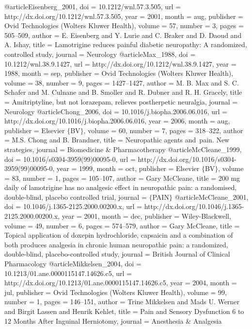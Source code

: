 @article{Eisenberg_2001,
	doi = {10.1212/wnl.57.3.505},
	url = {http://dx.doi.org/10.1212/wnl.57.3.505},
	year = 2001,
	month = {aug},
	publisher = {Ovid Technologies (Wolters Kluwer Health)},
	volume = {57},
	number = {3},
	pages = {505--509},
	author = {E. Eisenberg and Y. Lurie and C. Braker and D. Daoud and A. Ishay},
	title = {Lamotrigine reduces painful diabetic neuropathy: A randomized, controlled study},
	journal = {Neurology}
}
@article{Max_1988,
	doi = {10.1212/wnl.38.9.1427},
	url = {http://dx.doi.org/10.1212/wnl.38.9.1427},
	year = 1988,
	month = {sep},
	publisher = {Ovid Technologies (Wolters Kluwer Health)},
	volume = {38},
	number = {9},
	pages = {1427--1427},
	author = {M. B. Max and S. C. Schafer and M. Culnane and B. Smoller and R. Dubner and R. H. Gracely},
	title = {Amitriptyline, but not lorazepam, relieves postherpetic neuralgia},
	journal = {Neurology}
}
@article{Chong_2006,
	doi = {10.1016/j.biopha.2006.06.016},
	url = {http://dx.doi.org/10.1016/j.biopha.2006.06.016},
	year = 2006,
	month = {aug},
	publisher = {Elsevier $\lbrace$BV$\rbrace$},
	volume = {60},
	number = {7},
	pages = {318--322},
	author = {M.S. Chong and B. Brandner},
	title = {Neuropathic agents and~pain. New strategies},
	journal = {Biomedicine {\&} Pharmacotherapy}
}
@article{McCleane_1999,
	doi = {10.1016/s0304-3959(99)00095-0},
	url = {http://dx.doi.org/10.1016/s0304-3959(99)00095-0},
	year = 1999,
	month = {oct},
	publisher = {Elsevier $\lbrace$BV$\rbrace$},
	volume = {83},
	number = {1},
	pages = {105--107},
	author = {Gary McCleane},
	title = {200 mg daily of lamotrigine has no analgesic effect in neuropathic pain: a randomised, double-blind, placebo controlled trial},
	journal = {$\lbrace$PAIN$\rbrace$}
}
@article{McCleane_2001,
	doi = {10.1046/j.1365-2125.2000.00200.x},
	url = {http://dx.doi.org/10.1046/j.1365-2125.2000.00200.x},
	year = 2001,
	month = {dec},
	publisher = {Wiley-Blackwell},
	volume = {49},
	number = {6},
	pages = {574--579},
	author = {Gary McCleane},
	title = {Topical application of doxepin hydrochloride, capsaicin and a combination of both produces analgesia in chronic human neuropathic pain: a randomized, double-blind, placebo-controlled study},
	journal = {British Journal of Clinical Pharmacology}
}
@article{Mikkelsen_2004,
	doi = {10.1213/01.ane.0000115147.14626.c5},
	url = {http://dx.doi.org/10.1213/01.ane.0000115147.14626.c5},
	year = 2004,
	month = {jul},
	publisher = {Ovid Technologies (Wolters Kluwer Health)},
	volume = {99},
	number = {1},
	pages = {146--151},
	author = {Trine Mikkelsen and Mads U. Werner and Birgit Lassen and Henrik Kehlet},
	title = {Pain and Sensory Dysfunction 6 to 12 Months After Inguinal Herniotomy},
	journal = {Anesthesia {\&} Analgesia}
}
